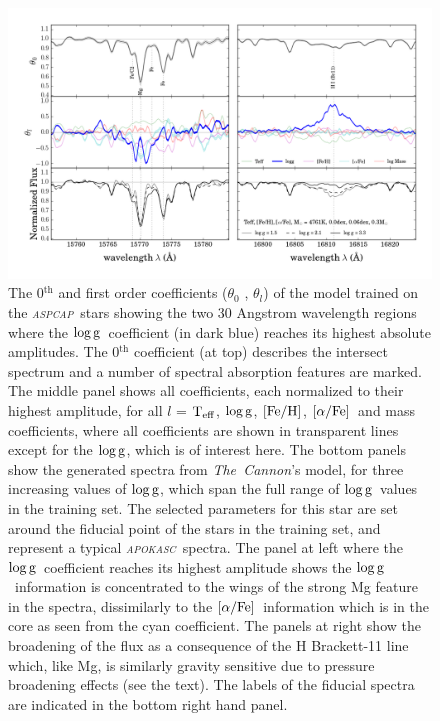 \documentclass[12pt, preprint]{aastex}
\newcommand{\project}[1]{\textsl{#1}}
\newcommand{\tc}{\project{The~Cannon}}
\newcommand{\apokasc}{\project{\textsc{apokasc}}}
\newcommand{\aspcap}{\project{\textsc{aspcap}}}
\newcommand{\teff}{\mbox{$\rm T_{eff}$}}
\newcommand{\feh}{\mbox{$\rm [Fe/H]$}}
\newcommand{\alphafe}{\mbox{$\rm [\alpha/Fe]$}}
\newcommand{\logg}{\mbox{$\rm \log g$}}
\begin{document}
\begin{figure}[p]
\centering
    \includegraphics[scale=0.51]{./plots/coeffs_g_3.png}
  \caption{The 0$^{\mbox{th}}$ and first order coefficients ($\theta_0$ , $\theta_{\mbox{$l$}}$) of the model trained on the \aspcap\ stars showing the two 30 Angstrom wavelength regions where the \logg\ coefficient (in dark blue) reaches its highest absolute amplitudes. The 0$^{\mbox{th}}$ coefficient (at top) describes the intersect spectrum and a number of spectral absorption features are marked. The middle panel shows all coefficients, each normalized to their highest amplitude, for all \textit{$l$} = \teff, \logg, \feh, \alphafe\ and mass coefficients, where all coefficients are shown in transparent lines except for the \logg, which is of interest here. The bottom panels show the generated spectra from \tc's model, for three increasing values of \logg, which span the full range of \logg\ values in the training set. The selected parameters for this star are set around the fiducial point of the stars in the training set, and represent a typical \apokasc\ spectra. The panel at left where the \logg\ coefficient reaches its highest amplitude shows the \logg\ information is concentrated to the wings of the strong Mg feature in the spectra, dissimilarly to the \alphafe\ information which is in the core as seen from the cyan coefficient. The panels at right show the broadening of the flux as a consequence of the H Brackett-11 line which, like Mg,  is similarly gravity sensitive due to pressure broadening effects (see the text). The labels of the fiducial spectra are indicated in the bottom right hand panel.}
\label{fig:logg}
\end{figure}
\end{document}
